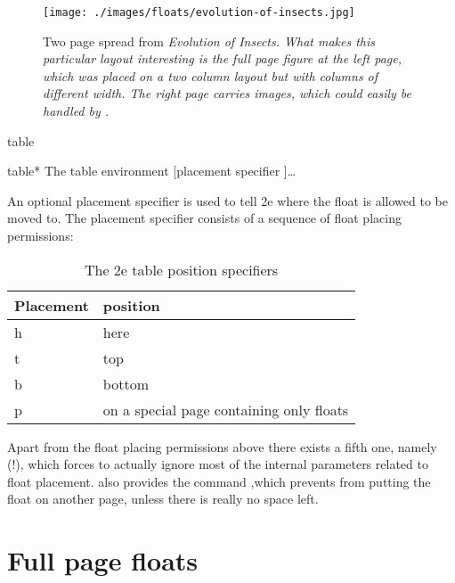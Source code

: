 \begin{figure}[hb]

\texttt{[image: ./images/floats/evolution-of-insects.jpg]}

\caption{Two page spread from \textit{Evolution of Insects. What makes this particular layout interesting is the full page figure at the left page, which was placed on a two column layout but with columns of different width. The right page carries images, which could easily be handled by \latexe.}}
\end{figure}

\begin{environment}{table}
\begin{environment}{table*}
 The table environment 
[placement specifier ]\ldots{}
\end{environment}
\end{environment}

An optional placement specifier is used to tell \latex2e where the float is allowed to be
moved to. The placement specifier consists of a sequence of float placing permissions:

\begin{table}[htbp]
\centering
\begin{tabular}{lp{3.5cm}}
\toprule
Placement   & position\\
\midrule
h                 & here\\
t                  & top\\
b                 & bottom\\
p                 & on a special page containing only floats\\
\bottomrule
\end{tabular}

\caption{The \latex2e table position specifiers}
\end{table}




Apart from the float placing permissions above there exists a fifth one, namely (!), which
forces \latex to actually ignore most of the internal parameters related to float placement.
\latex also provides the command ,which prevents \latex from putting the float on another page, unless there is really no space left.


\section{Full page floats}

